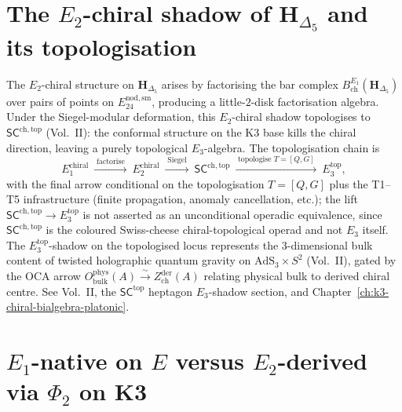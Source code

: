 \section{The \texorpdfstring{$E_2$}{E-2}-chiral shadow of \texorpdfstring{$\mathbf H_{\Delta_5}$}{H-Delta-5} and its topologisation}
\label{sec:e2ca-E2-shadow-topologisation}

\begin{remark}
\label{rem:e2ca-E2-shadow}
The $E_2$-chiral structure on $\mathbf H_{\Delta_5}$ arises by
factorising the bar complex $B^{E_1}_{\mathrm{ch}}(\mathbf H_{\Delta_5})$
over pairs of points on $E^{\mathrm{nod,sm}}_{24}$, producing a
little-$2$-disk factorisation algebra. Under the Siegel-modular
deformation, this $E_2$-chiral shadow topologises to
$\mathsf{SC}^{\mathrm{ch,top}}$ (Vol.~II): the conformal structure on
the K3 base kills the chiral direction, leaving a purely topological
$E_3$-algebra. The topologisation chain is
\[
E_1^{\mathrm{chiral}}\ \xrightarrow{\;\text{factorise}\;}\ E_2^{\mathrm{chiral}}\ \xrightarrow{\;\text{Siegel}\;}\ \mathsf{SC}^{\mathrm{ch,top}}\ \xrightarrow{\;\text{topologise } T = [Q, G]\;}\ E_3^{\mathrm{top}},
\]
with the final arrow conditional on the topologisation
$T = [Q, G]$ plus the T1--T5 infrastructure (finite propagation,
anomaly cancellation, etc.); the lift $\mathsf{SC}^{\mathrm{ch,top}}
\to E_3^{\mathrm{top}}$ is not asserted as an unconditional operadic
equivalence, since $\mathsf{SC}^{\mathrm{ch,top}}$ is the coloured
Swiss-cheese chiral-topological operad and not $E_3$ itself. The
$E_3^{\mathrm{top}}$-shadow on the topologised locus represents the
$3$-dimensional bulk content of twisted holographic quantum gravity
on $\mathrm{AdS}_3\times S^2$ (Vol.~II), gated by the OCA arrow
$O^{\mathrm{phys}}_{\mathrm{bulk}}(A) \xrightarrow{\sim}
Z^{\mathrm{der}}_{\mathrm{ch}}(A)$ relating physical bulk to derived
chiral centre. See Vol.~II, the $\mathsf{SC}^{\mathrm{top}}$ heptagon $E_3$-shadow section, and
Chapter~\ref{ch:k3-chiral-bialgebra-platonic}.
\end{remark}

\section{\texorpdfstring{$E_1$}{E-1}-native on \texorpdfstring{$E$}{E} versus \texorpdfstring{$E_2$}{E-2}-derived via \texorpdfstring{$\Phi_2$}{Phi-2} on K3}
\label{sec:e2ca-E1-native-vs-E2-derived}

